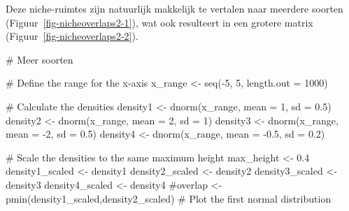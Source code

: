 \documentclass[
  a4paper,
]{scrbook}
\newenvironment{Shaded}{\begin{snugshade}}{\end{snugshade}}
\newcommand{\AttributeTok}[1]{\textcolor[rgb]{0.40,0.45,0.13}{#1}}
\newcommand{\CommentTok}[1]{\textcolor[rgb]{0.37,0.37,0.37}{#1}}
\newcommand{\DecValTok}[1]{\textcolor[rgb]{0.68,0.00,0.00}{#1}}
\newcommand{\FloatTok}[1]{\textcolor[rgb]{0.68,0.00,0.00}{#1}}
\newcommand{\FunctionTok}[1]{\textcolor[rgb]{0.28,0.35,0.67}{#1}}
\newcommand{\NormalTok}[1]{\textcolor[rgb]{0.00,0.23,0.31}{#1}}
\newcommand{\OtherTok}[1]{\textcolor[rgb]{0.00,0.23,0.31}{#1}}
\newcommand{\SpecialCharTok}[1]{\textcolor[rgb]{0.37,0.37,0.37}{#1}}
\theoremstyle{definition}
\theoremstyle{remark}
\begin{document}
Deze niche-ruimtes zijn natuurlijk makkelijk te vertalen naar meerdere
soorten (Figuur~\ref{fig-nicheoverlaps2-1}), wat ook resulteert in een
grotere matrix (Figuur~\ref{fig-nicheoverlaps2-2}).

\begin{Shaded}
\begin{Highlighting}[]
\CommentTok{\# Meer soorten}

\CommentTok{\# Define the range for the x{-}axis}
\NormalTok{  x\_range }\OtherTok{\textless{}{-}} \FunctionTok{seq}\NormalTok{(}\SpecialCharTok{{-}}\DecValTok{5}\NormalTok{, }\DecValTok{5}\NormalTok{, }\AttributeTok{length.out =} \DecValTok{1000}\NormalTok{)}
  
  \CommentTok{\# Calculate the densities}
\NormalTok{  density1 }\OtherTok{\textless{}{-}} \FunctionTok{dnorm}\NormalTok{(x\_range, }\AttributeTok{mean =} \DecValTok{1}\NormalTok{, }\AttributeTok{sd =} \FloatTok{0.5}\NormalTok{)}
\NormalTok{  density2 }\OtherTok{\textless{}{-}} \FunctionTok{dnorm}\NormalTok{(x\_range, }\AttributeTok{mean =} \DecValTok{2}\NormalTok{, }\AttributeTok{sd =} \DecValTok{1}\NormalTok{)}
\NormalTok{  density3 }\OtherTok{\textless{}{-}} \FunctionTok{dnorm}\NormalTok{(x\_range, }\AttributeTok{mean =} \SpecialCharTok{{-}}\DecValTok{2}\NormalTok{, }\AttributeTok{sd =} \FloatTok{0.5}\NormalTok{)}
\NormalTok{  density4 }\OtherTok{\textless{}{-}} \FunctionTok{dnorm}\NormalTok{(x\_range, }\AttributeTok{mean =} \SpecialCharTok{{-}}\FloatTok{0.5}\NormalTok{, }\AttributeTok{sd =} \FloatTok{0.2}\NormalTok{)}
  
  \CommentTok{\# Scale the densities to the same maximum height}
\NormalTok{  max\_height }\OtherTok{\textless{}{-}} \FloatTok{0.4}
\NormalTok{  density1\_scaled }\OtherTok{\textless{}{-}}\NormalTok{ density1 }
\NormalTok{  density2\_scaled }\OtherTok{\textless{}{-}}\NormalTok{ density2 }
\NormalTok{  density3\_scaled }\OtherTok{\textless{}{-}}\NormalTok{ density3 }
\NormalTok{  density4\_scaled }\OtherTok{\textless{}{-}}\NormalTok{ density4 }
  \CommentTok{\#overlap \textless{}{-} pmin(density1\_scaled,density2\_scaled)}
  \CommentTok{\# Plot the first normal distribution}
  

\end{Highlighting}
\end{Shaded}
\end{document}
